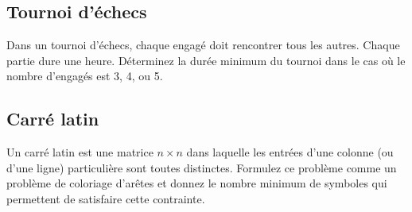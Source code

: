 \subsection{Tournoi d'échecs}
Dans un tournoi d'échecs, chaque engagé doit rencontrer tous les autres. Chaque partie dure une heure. Déterminez la durée minimum du tournoi dans le cas où le nombre d'engagés est 3, 4, ou 5.

\subsection{Carré latin}
Un carré latin est une matrice $n \times n$ dans laquelle les entrées d'une colonne (ou d'une ligne) particulière sont toutes distinctes. Formulez ce problème comme un problème de coloriage d'arêtes et donnez le nombre minimum de symboles qui permettent de satisfaire cette contrainte.
